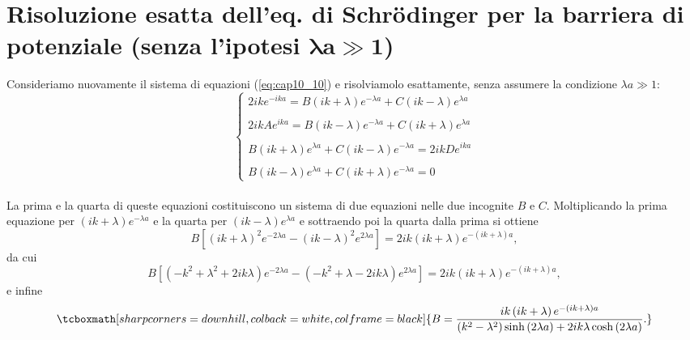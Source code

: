\section{Risoluzione esatta dell'eq. di Schr\"{o}dinger per la barriera di potenziale (senza l'ipotesi $\mathbf{\lambda a \gg 1} $)}
Consideriamo nuovamente il sistema di equazioni (\ref{eq:cap10_10}) e risolviamolo esattamente, senza assumere la condizione $\lambda a \gg 1 $:
\begin{equation}
		\begin{cases}
		\displaystyle{2ike^{-ika}= B \left(ik+\lambda\right)e^{-\lambda a} +C \left(ik-\lambda\right)e^{\lambda a} }\\
		\\
		\displaystyle{2ikAe^{ika}= B \left(ik-\lambda\right)e^{-\lambda a} +C \left(ik+\lambda\right)e^{\lambda a} }\\
		\\
		\displaystyle{B\left(ik+\lambda\right)e^{\lambda a} + C\left(ik-\lambda\right)e^{-\lambda a} = 2ikD e^{ika}}\\
		\\
		\displaystyle{B\left(ik-\lambda\right)e^{\lambda a} + C\left(ik+\lambda\right)e^{-\lambda a} =0}
		\end{cases}
	\end{equation}\\

La prima e la quarta di queste equazioni costituiscono un sistema di due equazioni nelle due incognite $B$ e $C$. Moltiplicando la prima equazione per $(ik+\lambda) e^{-\lambda a }$ e la quarta per $(ik-\lambda) e^{\lambda a }$ e sottraendo poi la quarta dalla prima si ottiene
	\begin{equation}
		B\left[ (ik+\lambda)^2 e^{-2\lambda a }-(ik-\lambda)^2 e^{2\lambda a }\right]= 2ik(ik+\lambda) e^{-\left(ik+\lambda\right) a },
	\end{equation} 
da cui
	\begin{equation}
		B\left[ (-k^2+\lambda ^2+2ik\lambda) e^{-2\lambda a }-(-k^2+\lambda-2ik\lambda) e^{2\lambda a }\right]= 2ik(ik+\lambda) e^{-\left(ik+\lambda\right) a },
	\end{equation}
e infine
	\begin{equation}
		\tcboxmath[sharp corners=downhill, colback=white, colframe=black]{
			B=\frac{ik\left(ik+\lambda \right)e^{-\left(ik+\lambda\right) a }}{\left(k^2-\lambda^2\right)\sinh \left(2\lambda a\right)+2ik\lambda \cosh\left(2\lambda a\right)}.
			}
	\end{equation}\\
	
